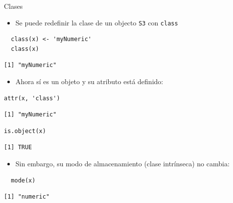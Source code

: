 \documentclass[xcolor={usenames,svgnames,dvipsnames}]{beamer}
\begin{document}
\begin{frame}[fragile,label={sec:orgheadline6}]{Clases}
 \begin{itemize}
\item Se puede redefinir la clase de un objecto \texttt{S3} con \texttt{class}
\end{itemize}
\lstset{language=R,label= ,caption= ,captionpos=b,numbers=none}
\begin{lstlisting}
  class(x) <- 'myNumeric'
  class(x)
\end{lstlisting}

\begin{verbatim}
[1] "myNumeric"
\end{verbatim}

\begin{itemize}
\item Ahora sí es un objeto y su atributo está definido:
\end{itemize}
\lstset{language=R,label= ,caption= ,captionpos=b,numbers=none}
\begin{lstlisting}
attr(x, 'class')
\end{lstlisting}

\begin{verbatim}
[1] "myNumeric"
\end{verbatim}

\lstset{language=R,label= ,caption= ,captionpos=b,numbers=none}
\begin{lstlisting}
is.object(x)
\end{lstlisting}

\begin{verbatim}
[1] TRUE
\end{verbatim}

\begin{itemize}
\item Sin embargo, su modo de almacenamiento (clase intrínseca) no cambia:
\end{itemize}
\lstset{language=R,label= ,caption= ,captionpos=b,numbers=none}
\begin{lstlisting}
  mode(x)
\end{lstlisting}

\begin{verbatim}
[1] "numeric"
\end{verbatim}
\end{frame}
\end{document}
